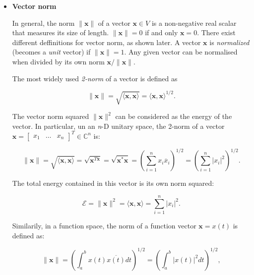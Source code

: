 \documentclass[10pt,b5paper,titlepage]{book}
\begin{document}
\begin{itemize}
    \item \textbf{Vector norm}

        In general, the norm $\|\mathbf{x}\|$ of a vector $\mathbf{x} \in V$
        is a non-negative real scalar that measures its size of length.
        $\|\mathbf{x}\| = 0$ if and only $\mathbf{x} = 0$. There exist
        different deffinitions for vector norm, as shown later. A vector
        $\mathbf{x}$ is \textit{normalized} (becomes a \textit{unit} vector)
        if $\|\mathbf{x}\| = 1$. Any given vector can be normalised when
        divided by its own norm $\mathbf{x} / \|\mathbf{x}\|$.

        The most widely used \textit{2-norm} of a vector is defined as

        \begin{equation}
            \|\mathbf{x}\| = \sqrt{\langle \mathbf{x}, \mathbf{x} \rangle}
            = \langle \mathbf{x}, \mathbf{x} \rangle^{1 / 2}
        .\end{equation}

        The vector norm squared $\|\mathbf{x}\|^{2}$ can be considered
        as the energy of the vector. In particular, un an \textit{n}-D
        unitary space, the 2-norm of a vector
        $\mathbf{x} = \begin{bmatrix} x_1 & \ldots & x_n \end{bmatrix}^{T} \in \mathbb{C}^{n}$ is:

        \begin{equation}
            \|\mathbf{x}\| = \sqrt{\langle \mathbf{x}, \mathbf{x} \rangle}
            = \sqrt{\mathbf{x}^{T \overline{\mathbf{x}}}}
            = \sqrt{\mathbf{x}^{*} \mathbf{x}}
            = \left( \sum_{i=1}^{n} x_{i} \overline{x}_{i} \right)^{1 / 2}
            = \left( \sum_{i=1}^{n} \left| x_{i} \right|^{2}  \right)^{1 / 2}
        .\end{equation}

        The total energy contained in this vector is its own norm squared:

        \begin{equation}
            \mathcal{E} = \|\mathbf{x}\|^{2}
            = \langle \mathbf{x}, \mathbf{x} \rangle
            = \sum_{i=1}^{n} \left| x_{i} \right|^{2}
        .\end{equation}

        Similarily, in a function space, the norm of a function vector
        $\mathbf{x} = x(t)$ is defined as:

        \begin{equation}
            \|\mathbf{x}\|
            = \left( \int_{a}^{b} x(t) \overline{x(t)} dt  \right)^{1 / 2}
            = \left( \int_{a}^{b} |x(t)|^{2} dt  \right)^{1 / 2}
        ,\end{equation}


\end{itemize}
\end{document}
